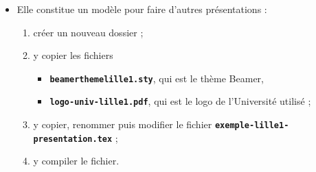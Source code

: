   \begin{itemize}
  \item Elle constitue un modèle pour faire d'autres présentations :
    
    \begin{enumerate}
    \item créer un nouveau dossier ;
    \item y copier les fichiers 

      \begin{itemize}
      \item \texttt{\textbf{beamerthemelille1.sty}}, qui est le thème Beamer,
      \item \texttt{\textbf{logo-univ-lille1.pdf}}, qui est le logo de l'Université utilisé ;
      \end{itemize}

    \item y copier, renommer puis modifier le fichier \texttt{\textbf{exemple-lille1-presentation.tex}} ;
    \item y compiler le fichier.
    \end{enumerate}
  \end{itemize}
